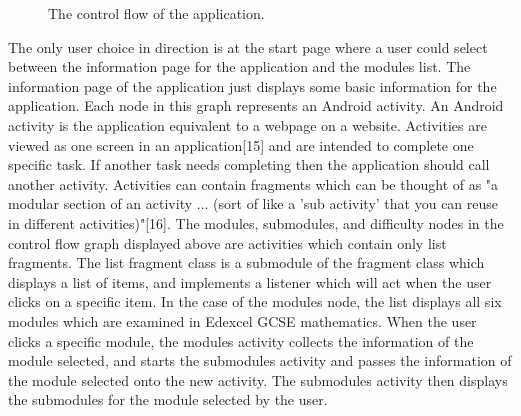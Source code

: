 \documentclass{article}
\begin{document}
\begin{figure}[H]
	\centering
	\caption{The control flow of the application.}
	\label{figure:applicationControlFlow}
\end{figure}

The only user choice in direction is at the start page where a user could select between the information page for the application and the modules list. The information page of the application just displays some basic information for the application. Each node in this graph represents an Android activity. An Android activity is the application equivalent to a webpage on a website. Activities are viewed as one screen in an application[15] and are intended to complete one specific task. If another task needs completing then the application should call another activity. Activities can contain fragments which can be thought of as "a modular section of an activity ... (sort of like a 'sub activity' that you can reuse in different activities)"[16]. The modules, submodules, and difficulty nodes in the control flow graph displayed above are activities which contain only list fragments. The list fragment class is a submodule of the fragment class which displays a list of items, and implements a listener which will act when the user clicks on a specific item. In the case of the modules node, the list displays all six modules which are examined in Edexcel GCSE mathematics. When the user clicks a specific module, the modules activity collects the information of the module selected, and starts the submodules activity and passes the information of the module selected onto the new activity. The submodules activity then displays the submodules for the module selected by the user. \\
\end{document}
